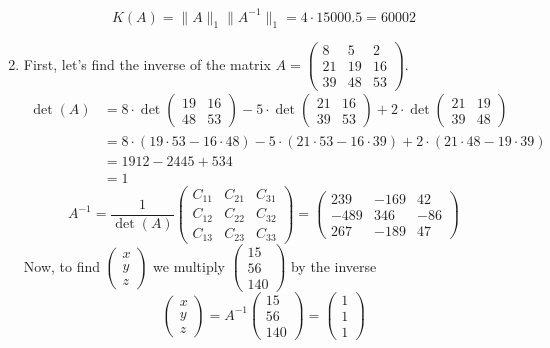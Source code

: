 \documentclass{article}
\newcommand*{\mat}[1]{\begin{pmatrix}#1\end{pmatrix}}
\begin{document}
\begin{enumerate}
{            \begin{displaymath}
                K(A) = \|A\|_1\|A^{-1}\|_1 = 4\cdot15000.5 = 60002
            \end{displaymath}
        }
        \item {
            First, let's find the inverse of the matrix \(A = \mat{8 & 5 & 2 \\ 21 & 19 & 16 \\ 39 & 48 & 53}\). 
            \begin{displaymath}
                \begin{aligned}
                    \det(A) 
                    &= 8\cdot\det\mat{19 & 16 \\ 48 & 53} - 5\cdot\det\mat{21 & 16 \\ 39 & 53} + 2\cdot\det\mat{21 & 19 \\ 39 & 48} \\
                    &= 8\cdot(19\cdot53-16\cdot48) - 5\cdot(21\cdot53-16\cdot39) + 2\cdot(21\cdot48-19\cdot39) \\
                    &= 1912 - 2445 + 534 \\
                    &= 1
                \end{aligned}
            \end{displaymath}
            \begin{displaymath}
                A^{-1} 
                = \frac{1}{\det(A)}\mat{C_{11} & C_{21} & C_{31} \\ C_{12} & C_{22} & C_{32} \\ C_{13} & C_{23} & C_{33}}
                = \mat{239 & -169 & 42 \\ -489 & 346 & -86 \\ 267 & -189 & 47}
            \end{displaymath}
            Now, to find \(\mat{x\\y\\z}\) we multiply \(\mat{15 \\ 56 \\ 140}\) by the inverse
            \begin{displaymath}
                \mat{x\\y\\z} 
                = A^{-1}\mat{15 \\ 56 \\ 140} 
                = \mat{1 \\ 1 \\ 1}
            \end{displaymath}
}
\end{enumerate}
\end{document}
